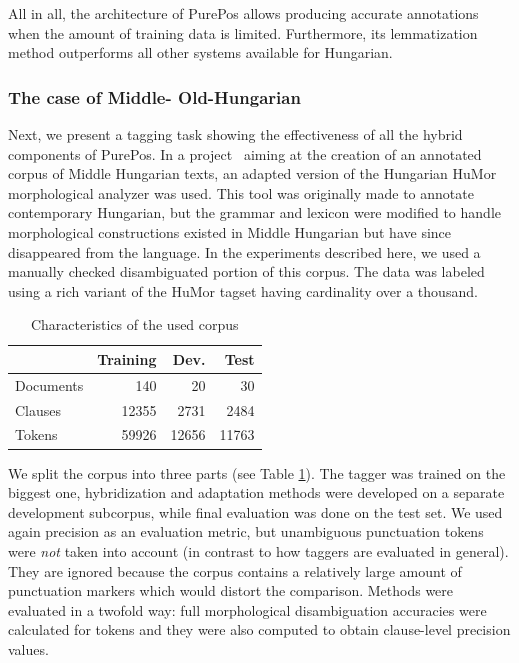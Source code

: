 All in all, the architecture of PurePos allows producing accurate annotations when the amount  of training data is limited. 
Furthermore, its lemmatization method outperforms all other systems available for Hungarian.


\subsubsection{The case of Middle- Old-Hungarian}
\label{sec:oldhungarian}

Next, we present a tagging task showing the effectiveness of all the hybrid components of PurePos. 
In a project~\cite{Novak2013} aiming at the creation of an annotated corpus of Middle Hungarian texts, an adapted version of the Hungarian HuMor morphological analyzer was used. 
This tool was originally made to annotate contemporary Hungarian, but the grammar and lexicon were modified to handle morphological constructions existed in Middle Hungarian but have since disappeared from the language. 
In the experiments described here, we used a manually checked disambiguated portion of this corpus. The data was labeled using a rich variant of the HuMor tagset having cardinality over a thousand.

\begin{table}[ht]
\centering
\caption{Characteristics of the used corpus}\label{tab:oldhun-corpus}
\begin{tabular}{l r r r}
\hline
& Training & Dev. & Test \\
\hline
Documents & 140 & 20 & 30 \\
Clauses & 12355 & 2731 & 2484 \\
Tokens & 59926 & 12656 &  11763\\
\hline
\end{tabular}
\end{table}

We split the corpus into three parts (see Table \ref{tab:oldhun-corpus}). 
The tagger was trained on the biggest one, hybridization and adaptation methods were developed on a separate development subcorpus, while final evaluation was done on the test set.
We used again precision as an evaluation metric, but unambiguous punctuation tokens were \emph{not} taken into account (in contrast to how taggers are evaluated in general). 
They are ignored because the corpus contains a relatively large amount of punctuation markers which would distort the comparison.
Methods were evaluated in a twofold way: full morphological disambiguation accuracies were calculated for tokens and they were also computed to obtain clause-level precision values.

